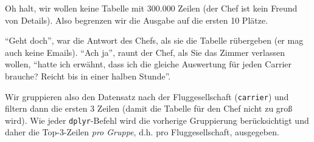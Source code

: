 \documentclass[12pt,ngerman,]{book}
\newenvironment{Shaded}{\begin{snugshade}}{\end{snugshade}}
\newcommand{\KeywordTok}[1]{\textcolor[rgb]{0.13,0.29,0.53}{\textbf{{#1}}}}
\newcommand{\DecValTok}[1]{\textcolor[rgb]{0.00,0.00,0.81}{{#1}}}
\newcommand{\StringTok}[1]{\textcolor[rgb]{0.31,0.60,0.02}{{#1}}}
\newcommand{\CommentTok}[1]{\textcolor[rgb]{0.56,0.35,0.01}{\textit{{#1}}}}
\newcommand{\NormalTok}[1]{{#1}}
\renewenvironment{Shaded}{\begin{kframe}}{\end{kframe}}
\begin{document}
Oh halt, wir wollen keine Tabelle mit 300.000 Zeilen (der Chef ist kein
Freund von Details). Also begrenzen wir die Ausgabe auf die ersten 10
Plätze.

\begin{Shaded}
\end{Shaded}

``Geht doch'', war die Antwort des Chefs, als sie die Tabelle rübergeben
(er mag auch keine Emails). ``Ach ja'', raunt der Chef, als Sie das
Zimmer verlassen wollen, ``hatte ich erwähnt, dass ich die gleiche
Auswertung für jeden Carrier brauche? Reicht bis in einer halben
Stunde''.

Wir gruppieren also den Datensatz nach der Fluggesellschaft
(\texttt{carrier}) und filtern dann die ersten 3 Zeilen (damit die
Tabelle für den Chef nicht zu groß wird). Wie jeder
\texttt{dplyr}-Befehl wird die vorherige Gruppierung berücksichtigt und
daher die Top-3-Zeilen \emph{pro Gruppe}, d.h. pro Fluggesellschaft,
ausgegeben.
\end{document}
